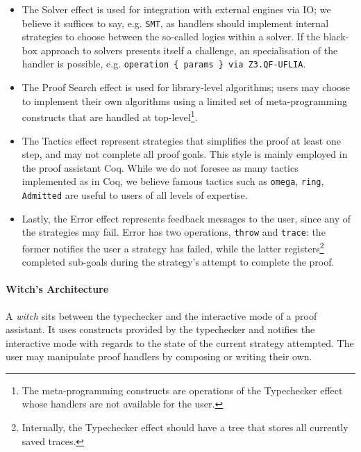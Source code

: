 \documentclass[sigconfl]{acmart}
\begin{document}
\begin{itemize}
  \item The Solver effect is used for integration with external engines via IO;
    we believe it suffices to say, e.g. \texttt{SMT}, as handlers should
    implement internal strategies to choose between the so-called logics
    within a solver. If the black-box approach to solvers presents itself a
    challenge, an specialisation of the handler is possible, e.g.
    \texttt{operation \{ params \} via Z3.QF-UFLIA}.
  \item The Proof Search effect is used for library-level algorithms; users may
    choose to implement their own algorithms using a limited set of
    meta-programming constructs that are handled at top-level\footnote{The
      meta-programming constructs are operations of the Typechecker effect
      whose handlers are not available for the user.}.
    \item The Tactics effect represent strategies that simplifies the proof at
      least one step, and may not complete all proof goals. This style is mainly
      employed in the proof assistant Coq. While we do not foresee as many
      tactics implemented as in Coq, we believe famous tactics such as
      \texttt{omega}, \texttt{ring}, \texttt{Admitted} are useful to users of
      all levels of expertise.
    \item Lastly, the Error effect represents feedback messages to the user,
      since any of the strategies may fail. Error has two operations,
      \texttt{throw} and \texttt{trace}: the former notifies the user a strategy
      has failed, while the latter registers\footnote{Internally, the
        Typechecker effect should have a tree that stores all currently
        saved traces.} completed sub-goals during the
      strategy's attempt to complete the proof.
\end{itemize}

\paragraph{Witch's Architecture}
A \textit{witch} sits between the typechecker and the interactive mode of a
proof assistant. It uses constructs provided by the typechecker and notifies the
interactive mode with regards to the state of the current strategy attempted.
The user may manipulate proof handlers by composing or writing their own.
\end{document}
